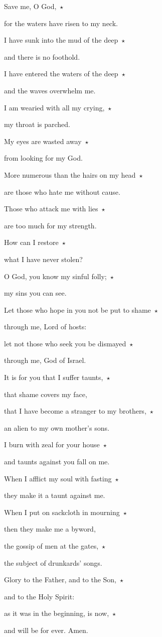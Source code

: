 \noindent Save me, O God,~$\star$~\nopagebreak

for the waters have risen to my neck.

\noindent I have sunk into the mud of the deep~$\star$~\nopagebreak

and there is no foothold.

\noindent I have entered the waters of the deep~$\star$~\nopagebreak

and the waves overwhelm me.

\noindent I am wearied with all my crying,~$\star$~\nopagebreak

my throat is parched.

\noindent My eyes are wasted away~$\star$~\nopagebreak

from looking for my God.

\noindent More numerous than the hairs on my head~$\star$~\nopagebreak

are those who hate me without cause.

\noindent Those who attack me with lies~$\star$~\nopagebreak

are too much for my strength.

\noindent How can I restore~$\star$~\nopagebreak

what I have never stolen?

\noindent O God, you know my sinful folly;~$\star$~\nopagebreak

my sins you can see.

\noindent Let those who hope in you not be put to shame~$\star$~\nopagebreak

through me, Lord of hosts:

\noindent let not those who seek you be dismayed~$\star$~\nopagebreak

through me, God of Israel.

\noindent It is for you that I suffer taunts,~$\star$~\nopagebreak

that shame covers my face,

\noindent that I have become a stranger to my brothers,~$\star$~\nopagebreak

an alien to my own mother’s sons.

\noindent I burn with zeal for your house~$\star$~\nopagebreak

and taunts against you fall on me.

\noindent When I afflict my soul with fasting~$\star$~\nopagebreak

they make it a taunt against me.

\noindent When I put on sackcloth in mourning~$\star$~\nopagebreak

then they make me a byword,

\noindent the gossip of men at the gates,~$\star$~\nopagebreak

the subject of drunkards’ songs.

\noindent Glory to the Father, and to the Son,~$\star$~\nopagebreak

and to the Holy Spirit:

\noindent as it was in the beginning, is now,~$\star$~\nopagebreak

and will be for ever. Amen.
